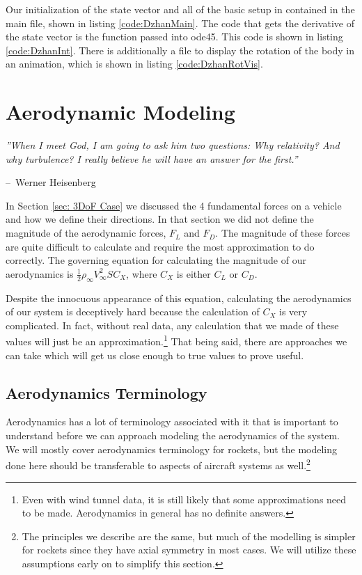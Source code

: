 \documentclass[12pt]{report}
\makeatletter
\newenvironment{chapquote}[2][2em]
  {\setlength{\@tempdima}{#1}%
   \def\chapquote@author{#2}%
   \parshape 1 \@tempdima \dimexpr\textwidth-2\@tempdima\relax%
   \itshape}
  {\par\normalfont\hfill--\ \chapquote@author\hspace*{\@tempdima}\par\bigskip}
\makeatother
\begin{document}
Our initialization of the \gls{state vector} and all of the basic setup in contained in the main file, shown in listing \ref{code:DzhanMain}. The code that gets the derivative of the \gls{state vector} is the function passed into ode45. This code is shown in listing \ref{code:DzhanInt}. There is additionally a file to display the rotation of the body in an animation, which is shown in listing \ref{code:DzhanRotVis}.

\chapter{Aerodynamic Modeling}\label{sec: aerodynamics}
\begin{chapquote}{Werner Heisenberg}
''When I meet God, I am going to ask him two questions: Why relativity? And why turbulence? I really believe he will have an answer for the first.''
\end{chapquote}
In Section \ref{sec: 3DoF Case} we discussed the 4 fundamental forces on a vehicle and how we define their directions. In that section we did not define the magnitude of the aerodynamic forces, $F_L$ and $F_D$. The magnitude of these forces are quite difficult to calculate and require the most approximation to do correctly. The governing equation for calculating the magnitude of our aerodynamics is $\frac{1}{2}\rho_{\infty}V^2_{\infty}SC_X$, where $C_X$ is either $C_L$ or $C_D$.


Despite the innocuous appearance of this equation, calculating the aerodynamics of our system is deceptively hard because the calculation of $C_X$ is very complicated. In fact, without real data, any calculation that we made of these values will just be an approximation.\footnote{Even with wind tunnel data, it is still likely that some approximations need to be made. Aerodynamics in general has no definite answers.} That being said, there are approaches we can take which will get us close enough to true values to prove useful.

\section{Aerodynamics Terminology}
Aerodynamics has a lot of terminology associated with it that is important to understand before we can approach modeling the aerodynamics of the system. We will mostly cover aerodynamics terminology for rockets, but the modeling done here should be transferable to aspects of aircraft systems as well.\footnote{The principles we describe are the same, but much of the modelling is simpler for rockets since they have axial symmetry in most cases. We will utilize these assumptions early on to simplify this section.}
\end{document}
